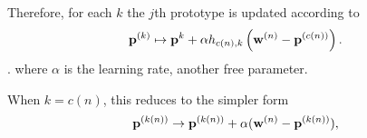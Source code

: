 \documentclass[fleqn,usenatbib]{mnras}
\begin{document}
        Therefore, for each $k$ the $j$th prototype is updated according to 
        \begin{equation} \label{eq:app:som_update_prototype}
            \mathbf{p}^{(k)} \mapsto \mathbf{p}^{k} + \alpha h_{c(n), k} \left(\mathbf{w}^{(n)} - \mathbf{p}^{(c(n))}\right).
        \end{equation}.
        where $\alpha$ is the learning rate, another free parameter.

        When $k=c(n)$, this reduces to the simpler form
        \begin{equation} \label{eq:app:som_BMU_update}
          \mathbf{p}^{(k(n))} \rightarrow \mathbf{p}^{(k(n))} + \alpha (\mathbf{w}^{(n)} - \mathbf{p}^{(k(n))}),
        \end{equation}




\label{lastpage}
\end{document}

